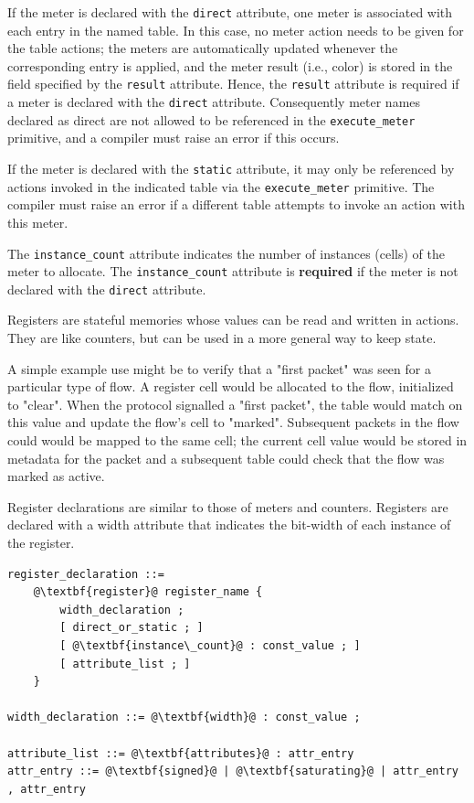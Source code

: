 \documentclass[12pt]{article}
\begin{document}
If the meter is declared with the \texttt{direct} attribute, one meter
is associated with each entry in the named table. In this case, no
meter action needs to be given for the table actions; the meters are
automatically updated whenever the corresponding entry is applied,
and the meter result (i.e., color) is stored in the field specified
by the \texttt{result} attribute. Hence, the \texttt{result} attribute
is required if a meter is declared with the \texttt{direct} attribute.
Consequently meter names declared as direct are not allowed to be
referenced in the \texttt{execute_meter} primitive, and a compiler must
raise an error if this occurs.

If the meter is declared with the \texttt{static} attribute, it may only
be referenced by actions invoked in the indicated table via the \texttt{execute_meter}
primitive. The compiler must raise an error if a different table
attempts to invoke an action with this meter.

The \texttt{instance_count} attribute indicates the number of
instances (cells) of the meter to allocate.  The
\texttt{instance_count} attribute is \textbf{required} if the meter
is not declared with the \texttt{direct} attribute.


Registers are stateful memories whose values can be read and written
in actions.  They are like counters, but can be used in a more general
way to keep state.

A simple example use might be to verify that a "first packet" was seen
for a particular type of flow. A register cell would be allocated to
the flow, initialized to "clear". When the protocol signalled a "first
packet", the table would match on this value and update the flow's
cell to "marked".  Subsequent packets in the flow could would be
mapped to the same cell; the current cell value would be stored in
metadata for the packet and a subsequent table could check that the
flow was marked as active.

Register declarations are similar to those of meters and
counters. Registers are declared with a width
attribute that indicates the bit-width of each instance of
the register.

\begin{lstlisting}[frame=single,backgroundcolor=\color{bnfgreen},escapechar=\@]
register_declaration ::=
    @\textbf{register}@ register_name {
        width_declaration ;
        [ direct_or_static ; ]
        [ @\textbf{instance\_count}@ : const_value ; ]
        [ attribute_list ; ]
    }

width_declaration ::= @\textbf{width}@ : const_value ;

attribute_list ::= @\textbf{attributes}@ : attr_entry
attr_entry ::= @\textbf{signed}@ | @\textbf{saturating}@ | attr_entry , attr_entry
\end{lstlisting}
\end{document}

